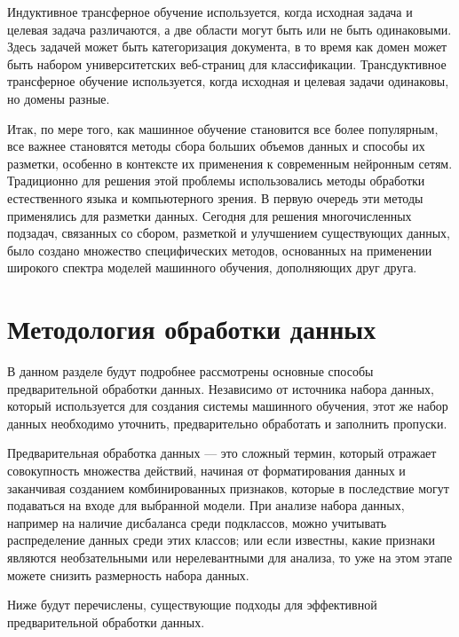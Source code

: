 \documentclass[12pt,a4paper, oneside]{extreport}
\begin{document}
Индуктивное трансферное обучение используется, когда исходная задача и целевая задача различаются, а две области могут быть или не быть одинаковыми. Здесь задачей может быть категоризация документа, в то время как домен может быть набором университетских веб-страниц для классификации.
Трансдуктивное трансферное обучение используется, когда исходная и целевая задачи одинаковы, но домены разные. 


Итак, по мере того, как машинное обучение становится все более популярным, все важнее становятся методы сбора больших объемов  данных и способы  их разметки, особенно в контексте их применения к современным  нейронным сетям. Традиционно для  решения этой проблемы использовались методы обработки естественного языка и компьютерного зрения. В первую очередь эти методы применялись  для разметки данных. Сегодня для решения многочисленных подзадач, связанных со сбором, разметкой и улучшением существующих данных, было создано множество специфических методов, основанных на применении широкого спектра моделей машинного обучения, дополняющих  друг друга. 


\section{Методология обработки  данных}


В данном разделе будут подробнее рассмотрены основные способы предварительной  обработки  данных. Независимо от источника набора данных, который используется  для создания системы машинного обучения, этот же набор данных необходимо уточнить, предварительно обработать и заполнить пропуски.

Предварительная обработка данных — это сложный термин, который отражает совокупность множества действий, начиная от форматирования данных и заканчивая созданием комбинированных признаков, которые в последствие могут подаваться на входе для выбранной модели. При анализе набора данных, например на наличие  дисбаланса среди подклассов, можно учитывать распределение данных среди этих классов; или если известны, какие признаки  являются необзательными или нерелевантными для анализа, то уже на этом этапе можете снизить  размерность набора данных. 

Ниже  будут перечислены, существующие  подходы для эффективной предварительной обработки данных.
\end{document}
